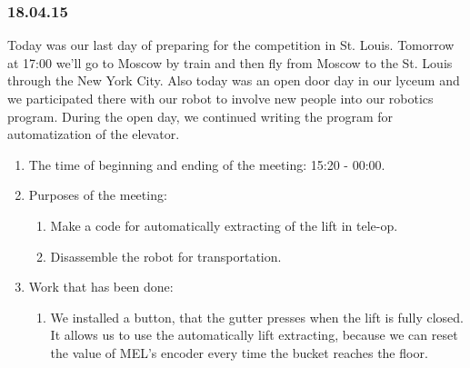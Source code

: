 \subsubsection{18.04.15}
Today was our last day of preparing for the competition in St. Louis. Tomorrow at 17:00 we'll go to Moscow by train and then fly from Moscow to the St. Louis through the New York City.\newline
Also today was an open door day in our lyceum and we participated there with our robot to involve new people into our robotics program. During the open day, we continued writing the program for automatization of the elevator.
\begin{enumerate}
	
	\item The time of beginning and ending of the meeting: 15:20 - 00:00.
	
	\item Purposes of the meeting: 
	\begin{enumerate}
		
		\item Make a code for automatically extracting of the lift in tele-op.
		
		\item Disassemble the robot for transportation.
		
	\end{enumerate}

	\item Work that has been done:
	\begin{enumerate}
		
		\item We installed a button, that the gutter presses when the lift is fully closed. It allows us to use the automatically lift extracting, because we can reset the value of MEL's encoder every time the bucket reaches the floor.
		\begin{figure}[H]
			\begin{minipage}[h]{0.2\linewidth}
				\center  
			\end{minipage}
			\begin{minipage}[h]{0.6\linewidth}
				\caption{}
			\end{minipage}
		\end{figure} 
		

\end{enumerate}
\end{enumerate}
